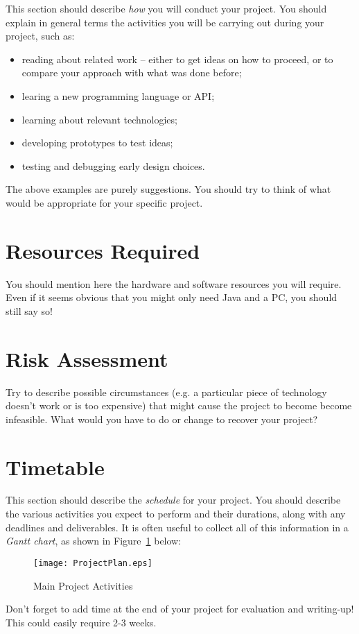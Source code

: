 \documentclass[a4paper,12pt]{article}
\begin{document}
This section should describe {\em how} you will conduct
your project. You should explain in general terms
the activities you will be carrying out during your project, such as:
%
\begin{itemize}
\item reading about related work -- either to get ideas on how to
      proceed, or to compare your approach with what was done before;
\item learing a new programming language or API;
\item learning about relevant technologies;
\item developing prototypes to test ideas;
\item testing and debugging early design choices.
\end{itemize}
%
The above examples are purely suggestions. You should try to think
of what would be appropriate for your specific project.

\section*{Resources Required}

You should mention here the hardware and software resources you will
require. Even if it seems obvious that you might only need Java and a PC, 
you should still say so!


\section*{Risk Assessment}

Try to describe possible circumstances (e.g. a particular piece of
technology doesn't work or is too expensive) that might cause
the project to become become infeasible. What would you have to do
or change to recover your project?

\section*{Timetable}

This section should describe the {\em schedule} for your project. 
You should describe the various activities you expect to perform
and their durations, along with any deadlines and deliverables.
It is often useful to collect all of this information in a
{\em Gantt chart}, as shown in Figure~\ref{fig:plan} below:

\begin{figure}[htb]
\begin{center}
\texttt{[image: ProjectPlan.eps]}
\caption{Main Project Activities\label{fig:plan}}
\end{center}
\end{figure}


Don't forget to add time at the end of your project for 
evaluation and writing-up! This could easily require 2-3 weeks.



\end{document}
